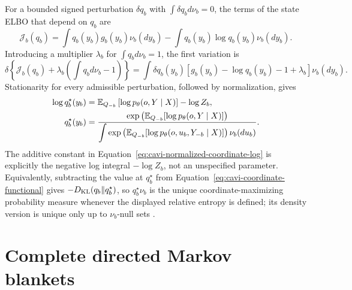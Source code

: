 For a bounded signed perturbation \(\delta q_b\) with \(\int\delta q_b d\nu_b=0\), the terms of the state ELBO that depend on \(q_b\) are
\begin{equation}
\mathcal J_b(q_b)
=\int q_b(y_b)g_b(y_b)\nu_b(dy_b)
-\int q_b(y_b)\log q_b(y_b)\nu_b(dy_b).
\label{eq:cavi-coordinate-functional}
\end{equation}
Introducing a multiplier \(\lambda_b\) for \(\int q_b d\nu_b=1\), the first variation is
\begin{equation}
\delta\left\{\mathcal J_b(q_b)
+\lambda_b\left(\int q_b d\nu_b-1\right)\right\}
=\int\delta q_b(y_b)
\left[g_b(y_b)-\log q_b(y_b)-1+\lambda_b\right]\nu_b(dy_b).
\label{eq:cavi-constrained-first-variation}
\end{equation}
Stationarity for every admissible perturbation, followed by normalization, gives
\begin{align}
\log q_b^\star(y_b)
&=\mathbb E_{Q_{-b}}\left[\log p_\theta(o,Y\mid X)\right]-\log Z_b,
\label{eq:cavi-normalized-coordinate-log}\\
q_b^\star(y_b)
&=\frac{\exp\left(\mathbb E_{Q_{-b}}[\log p_\theta(o,Y\mid X)]\right)}
{\displaystyle\int
\exp\left(\mathbb E_{Q_{-b}}[\log p_\theta(o,u_b,Y_{-b}\mid X)]\right)
\nu_b(du_b)}.
\label{eq:cavi-normalized-coordinate-density}
\end{align}
The additive constant in Equation~\eqref{eq:cavi-normalized-coordinate-log} is explicitly the negative log integral \(-\log Z_b\), not an unspecified parameter. Equivalently, subtracting the value at \(q_b^\star\) from Equation~\eqref{eq:cavi-coordinate-functional} gives \(-D_{\mathrm{KL}}(q_b\Vert q_b^\star)\), so \(q_b^\star\nu_b\) is the unique coordinate-maximizing probability measure whenever the displayed relative entropy is defined; its density version is unique only up to \(\nu_b\)-null sets \citep{Bishop2006,Blei2017,Wainwright2008}.

\section{Complete directed Markov blankets}

